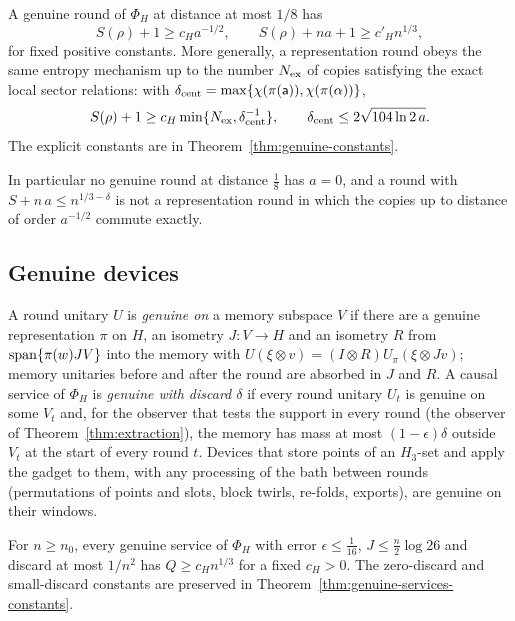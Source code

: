 \begin{theorem}\label{thm:genuine}
A genuine round of $\Phi_H$ at distance at most $1/8$ has
\[
 S(\rho)+1\geq c_Ha^{-1/2},\qquad
 S(\rho)+na+1\geq c'_Hn^{1/3},
\]
for fixed positive constants. More generally, a representation
round obeys the same entropy mechanism up to the number
$N_{\rm ex}$ of copies satisfying the exact local sector relations:
with $\delta_{\rm cent}=\max\{\chi(\pi(\mathsf a)),\chi(\pi(\alpha))\}$,
\[
 S(\rho)+1\geq c_H\min\{N_{\rm ex},\delta_{\rm cent}^{-1}\},\qquad
 \delta_{\rm cent}\leq2\sqrt{104\ln2\,a}.
\]
The explicit constants are in Theorem~\ref{thm:genuine-constants}.
\end{theorem}

In particular no genuine round at distance $\frac18$ has $a=0$, and a round with $S+n\,a\le n^{1/3-\delta}$ is not a representation round in which the
copies up to distance of order $a^{-1/2}$ commute exactly.

\subsection{Genuine devices}

A round unitary $U$ is \emph{genuine on} a memory subspace $V$ if there are a genuine representation $\pi$ on $H$, an isometry $J:V\to H$ and an
isometry $R$ from $\operatorname{span}\{\pi(w)JV\}$ into the memory with $U(\xi\otimes v)=(I\otimes R)U_\pi(\xi\otimes Jv)$; memory unitaries before and after the
round are absorbed in $J$ and $R$. A causal service of $\Phi_H$ is \emph{genuine with discard $\delta$} if every round unitary $U_t$ is genuine on some
$V_t$ and, for the observer that tests the support in every round (the observer of Theorem~\ref{thm:extraction}), the memory has mass at most
$(1-\epsilon)\delta$ outside $V_t$ at the start of every round $t$. Devices that store points of an $H_3$-set and apply the gadget to them, with any
processing of the bath between rounds (permutations of points and slots, block twirls, re-folds, exports), are genuine on their windows.

\begin{theorem}\label{thm:genuine-services}
For $n\ge n_0$, every genuine service of $\Phi_H$ with error $\epsilon\le\frac1{16}$,
$J\le\frac n2\log26$ and discard at most $1/n^2$ has
$Q\ge c_H n^{1/3}$ for a fixed $c_H>0$.
The zero-discard and small-discard constants are preserved in
Theorem~\ref{thm:genuine-services-constants}.
\end{theorem}

